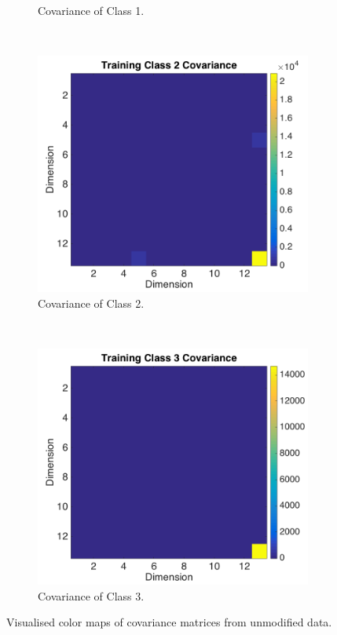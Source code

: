 \documentclass[a4paper, 10pt, conference]{ieeeconf}
\begin{document}
\begin{figure}[!ht]
\begin{subfigure}{0.5\textwidth}
      \caption{Covariance of Class 1.}
      \label{fig:covclass1}
    \end{subfigure}
    \\
    \begin{subfigure}{0.5\textwidth}
      \includegraphics[width=\textwidth]{pic/covclass2.png}
      \caption{Covariance of Class 2.}
      \label{fig:covclass2}
    \end{subfigure}
    ~
    \begin{subfigure}{0.5\textwidth}
      \includegraphics[width=\textwidth]{pic/covclass3.png}
      \caption{Covariance of Class 3.}
      \label{fig:covclass3}
    \end{subfigure}
	\caption{Visualised color maps of covariance matrices from unmodified data.}
  \label{fig:covtrainingall}
\end{figure}
\end{document}

